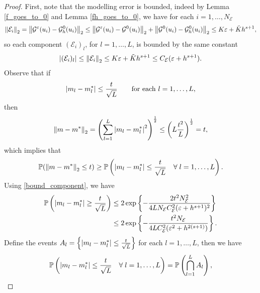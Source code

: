 \documentclass[10pt]{article}
\begin{document}
\begin{proof}
First, note that the modelling error is bounded, indeed by Lemma \ref{f_goes_to_0} and Lemma \ref{fh_goes_to_0}, we have for each $i = 1, \dots, N_{\mathcal{E}}$
\begin{equation*}
\left\|\mathcal{E}_i\right\|_2 = \left\|\mathcal{G}^{\varepsilon}(u_i) - \mathcal{G}^0_h(u_i)\right\|_2 \le \left\|\mathcal{G}^{\varepsilon}(u_i) - \mathcal{G}^0(u_i)\right\|_2 + \left\|\mathcal{G}^0(u_i) - \mathcal{G}^0_h(u_i)\right\|_2 \le K \varepsilon + \tilde{K} h^{s+1},
\end{equation*}
so each component $(\mathcal{E}_i)_l$, for $l = 1, \dots, L$, is bounded by the same constant
\begin{equation}
\label{bound_component}
\left\lvert(\mathcal{E}_i)_l\right\rvert \le \left\|\mathcal{E}_i\right\|_2 \le K \varepsilon + \tilde{K} h^{s+1} \le C_{\mathcal{E}} ( \varepsilon + h^{s+1} ).
\end{equation}
Observe that if
\[ \left\lvert m_l - m^*_l\right\rvert \le \frac{t}{\sqrt{L}} \qquad \text{for each } l = 1, \dots, L, \]
then
\begin{equation*}
\left\|m - m^*\right\|_2 = \left ( \sum_{l=1}^L \left\lvert m_l - m^*_l\right\rvert^2 \right )^{\frac{1}{2}} \le \left ( L \frac{t^2}{L} \right )^{\frac{1}{2}} = t,
\end{equation*}
which implies that
\begin{equation}
\label{1toL}
\mathbb{P}( \left\|m - m^*\right\|_2 \le t ) \ge \mathbb{P} \left ( \left\lvert m_l - m^*_l\right\rvert \le \frac{t}{\sqrt{L}} \quad \forall \; l = 1, \dots, L \right ).
\end{equation}
Using \eqref{bound_component},  we have
\begin{equation}
\begin{aligned}
\label{hoeffding}
\mathbb{P} \left ( \left\lvert m_l - m^*_l\right\rvert \ge \frac{t}{\sqrt{L}} \right ) &\le 2 \exp \left \{ - \frac{2 t^2 N_{\mathcal{E}}^2}{4 L N_{\mathcal{E}} C_{\mathcal{E}}^2 (\varepsilon + h^{s+1})^2 } \right \} \\
&\le 2 \exp \left \{ - \frac{t^2 N_{\mathcal{E}}}{4 L C_{\mathcal{E}}^2 (\varepsilon^2 + h^{2(s+1)})} \right \}.
\end{aligned}
\end{equation}
Define the events $A_l = \left \{ \left\lvert m_l - m^*_l\right\rvert \le \frac{t}{\sqrt{L}} \right \}$ for each $l = 1, \dots, L$, then we have
\begin{equation*}
\mathbb{P} \left ( \abs{m_l - m^*_l} \le \frac{t}{\sqrt{L}} \quad \forall \; l = 1, \dots, L \right ) = \mathbb{P} \left ( \bigcap_{l=1}^L A_l \right ),

\end{equation*}
\end{proof}
\end{document}
